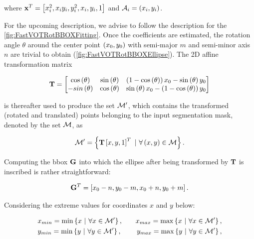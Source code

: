 \noindent where $\mathbf{x}^T = \left[ {{x}_{i}^{2}, x_i y_i, {y}_{i}^{2}, x_i, y_i, 1} \right]$ and $\mathcal{A}_i = \left( {x_i, y_i} \right)$.

For the upcoming description, we advise to follow the description for the \cref{fig:FastVOTRotBBOXFitting}. Once the coefficients are estimated, the rotation angle $\theta$ around the center point $\left( {x_0, y_0} \right)$ with semi-major $m$ and semi-minor axis $n$ are trivial to obtain (\cref{fig:FastVOTRotBBOXEllipse}). The 2D affine transformation matrix

\begin{equation}
    \mathbf{T} =
    \begin{bmatrix}
        {\cos} \left( \theta \right) &
        {\sin} \left( \theta \right) &
        \left( {1 - {\cos} \left( \theta \right)} \right)x_0 - {\sin} \left( \theta \right) y_0\\
        -{sin} \left( \theta \right) &
        {\cos} \left( \theta \right) &
        {\sin} \left( \theta \right) x_0 - \left( {1 - {\cos} \left( \theta \right)} \right) y_0
    \end{bmatrix}
\end{equation}

\noindent is thereafter used to produce the set $\mathcal{M'}$, which contains the transformed (rotated and translated) points belonging to the input segmentation mask, denoted by the set $\mathcal{M}$, as

\begin{equation}
    \mathcal{M'} =
    \left\{ {
        \mathbf{T}
        \left[ {x, y, 1} \right]^T
        \ | \
        \forall \left( {x, y} \right) \in \mathcal{M}
    } \right\}.
\end{equation}

\noindent Computing the \gls{bbox} $\mathbf{G}$ into which the ellipse after being transformed by $\mathbf{T}$ is inscribed is rather straightforward:

\begin{equation}
    {\mathbf{G}}^T = \left[ {x_0 - n, y_0 - m, x_0 + n, y_0 + m} \right].
\end{equation}

\noindent Considering the extreme values for coordinates $x$ and $y$ below:

\begin{equation}
    \begin{aligned}
        &x_{min} = \min \left\{ {x\ |\ \forall x \in \mathcal{M'}} \right\},
        \quad
        &x_{max} = \max \left\{ {x\ |\ \forall x \in \mathcal{M'}} \right\},\\
        &y_{min} = \min \left\{ {y\ |\ \forall y \in \mathcal{M'}} \right\},
        \quad
        &y_{max} = \max \left\{ {y\ |\ \forall y \in \mathcal{M'}} \right\},
    \end{aligned}
\end{equation}

